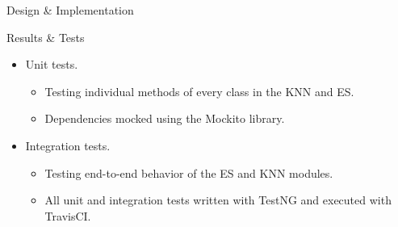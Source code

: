 \documentclass[final]{beamer} %
\begin{document}
\begin{frame}
\begin{columns}
\begin{column}{.35\textwidth}
{\begin{block}{Design \& Implementation}
				\end{block}
				\begin{block}{Results \& Tests}
					\begin{itemize}
						\item Unit tests.
						\begin{itemize}
							\item Testing individual methods of every class in the KNN and ES.
							\item Dependencies mocked using the Mockito library.
						\end{itemize}
					\end{itemize}
					
					\begin{itemize}
						\item Integration tests.
						\begin{itemize}
							\item Testing end-to-end behavior of the ES and KNN modules.
							\item All unit and integration tests written with TestNG and executed with TravisCI.
						\end{itemize}
					\end{itemize}
				

\end{block}}
\end{column}
\end{columns}
\end{frame}
\end{document}
